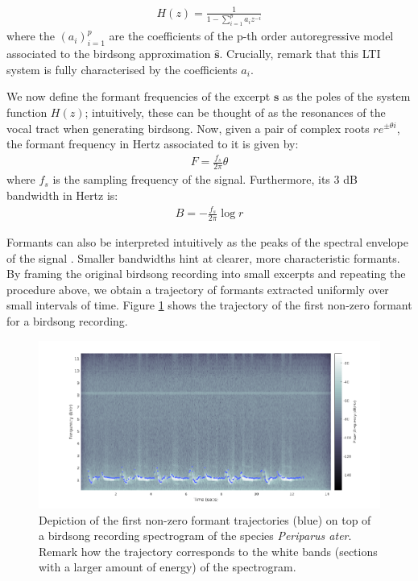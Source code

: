 \documentclass[pdftex,11pt,a4paper]{article}
\theoremstyle{definition}
\theoremstyle{remark}
\newcommand*{\V}[1]{\mathbf{#1}}%
\begin{document}
\begin{align*}
H(z) = \frac{1}{1-\sum_{i=1}^pa_iz^{-i}}
\end{align*}
where the $(a_i)_{i=1}^p$ are the coefficients of the p-th order autoregressive model associated to the birdsong approximation $\hat{\V{s}}$. Crucially, remark that this LTI system is fully characterised by the coefficients $a_i$. 
\par We now define the formant frequencies of the excerpt $\V{s}$ as the poles of the system function $H(z)$; intuitively, these can be thought of as the resonances of the vocal tract \cite{Prica2010} when generating birdsong. Now, given a pair of complex roots $re^{\pm\theta i}$, the formant frequency in Hertz associated to it is given by:
\begin{align*}
F = \frac{f_s}{2\pi}\theta
\end{align*}
where $f_s$ is the sampling frequency of the signal. Furthermore, its 3 dB bandwidth in Hertz is:
\begin{align*}
B = -\frac{f_s}{2\pi}\log{r}
\end{align*}
\par Formants can also be interpreted intuitively as the peaks of the spectral envelope of the signal \cite{Darch}. Smaller bandwidths hint at clearer, more characteristic formants. By framing the original birdsong recording into small excerpts and repeating the procedure above, we obtain a trajectory of formants extracted uniformly over small intervals of time. Figure \ref{fig_specformants} shows the trajectory of the first non-zero formant for a birdsong recording.

\begin{figure}[t]
\centering
\includegraphics[width=\textwidth]{images/formants}
\caption{Depiction of the first non-zero formant trajectories (blue) on top of a birdsong recording spectrogram of the species \emph{Periparus ater}. Remark how the trajectory corresponds to the white bands (sections with a larger amount of energy) of the spectrogram.}
\label{fig_specformants}
\end{figure}
\end{document}
